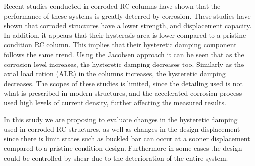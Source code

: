 Recent studies conducted in corroded RC columns have shown that the performance of these systems is greatly deterred by corrosion. These studies have shown that corroded structures have a lower strength, and displacement capacity. In addition, it appears that their hysteresis area is lower compared to a pristine condition RC column. This implies that their hysteretic damping component follows the same trend. Using the Jacobsen approach it can be seen that as the corrosion level increases, the hysteretic damping decreases too. Similarly as the axial load ration (ALR) in the columns increases, the hysteretic damping decreases. The scopes of these studies is limited, since the detailing used is not what is prescribed in modern structures, and the accelerated corrosion process used high levels of current density, further affecting the measured results. 

In this study we are proposing to evaluate changes in the hysteretic damping used in corroded RC structures, as well as changes in the design displacement since there is limit states such as buckled bar can occur at a sooner displacement compared to a pristine condition design. Furthermore in some cases the design could be controlled by shear due to the deterioration of the entire system.
